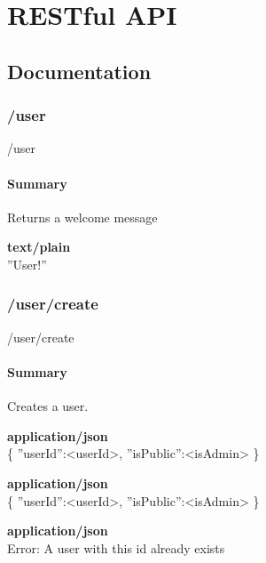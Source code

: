 \documentclass[11pt,fleqn,openany]{book} %
\begin{document}

\part{RESTful API}



\chapter{Documentation}

\section{/user}
\begin{get}
/user
\end{get}

\subsection*{Summary}
Returns a welcome message
\begin{parameter}
\end{parameter}
\begin{return}[SUCCESS]
\textbf{text/plain}\\
''User!''
\end{return}

\section{/user/create}
\begin{post}
/user/create
\end{post}

\subsection*{Summary}
Creates a user.
\begin{parameter}
\textbf{application/json}\\
\{ ''userId'':<userId>, ''isPublic'':<isAdmin> \}
\end{parameter}
\begin{return}[CREATED]
\textbf{application/json}\\
\{ ''userId'':<userId>, ''isPublic'':<isAdmin> \}
\end{return}
\begin{return}[CONFLICT]
\textbf{application/json}\\
Error: A user with this id already exists
\end{return}
\end{document}
